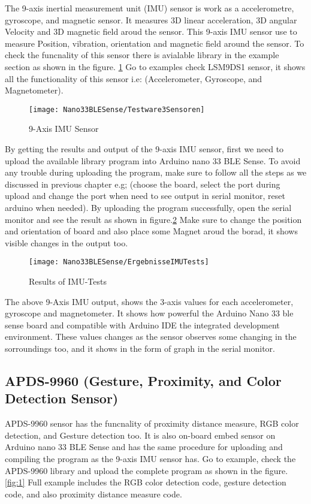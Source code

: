 The 9-axis inertial measurement unit (IMU) sensor is work as a accelerometre, gyroscope, and magnetic sensor. It measures 3D linear acceleration, 3D angular Velocity and 3D magnetic field aroud the sensor. This 9-axis IMU sensor use to measure Position, vibration, orientation and magnetic field around the sensor. To check the funcnality of this sensor there is avialable library in the example section as shown in the figure. \ref{fig:Testware} Go to examples check LSM9DS1 sensor, it shows all the functionality of this sensor i.e: (Accelerometer, Gyroscope, and Magnetometer).


\begin{figure}[htbp]
	\centering
	\texttt{[image: Nano33BLESense/Testware3Sensoren]}
	\caption{9-Axis IMU Sensor}
	\label{fig:Testware}
\end{figure}

By getting the results and output of the 9-axis IMU sensor, first we need to upload the available library program into Arduino nano 33 BLE Sense. To avoid any trouble during uploading the program, make sure to follow all the steps as we discussed in previous chapter e.g; (choose the board, select the port during upload and change the port when need to see output in serial monitor, reset arduino when needed). By uploading the program successfully, open the serial monitor and see the result as shown in figure.\ref{fig:IMU-Test} Make sure to change the position and orientation of board and also place some Magnet aroud the borad, it shows visible changes in the output too.

\begin{figure}[htbp]
	\centering
	\texttt{[image: Nano33BLESense/ErgebnisseIMUTests]}
	\caption{Results of IMU-Tests}
	\label{fig:IMU-Test}
\end{figure}

The above 9-Axis IMU output, shows the 3-axis values for each accelerometer, gyroscope and magnetometer. It shows how powerful the Arduino Nano 33 ble sense board and compatible with Arduino IDE the integrated development environment. These values changes as the sensor observes some changing in the sorroundings too, and it shows in the form of graph in the serial monitor. 


\subsection{APDS-9960 (Gesture, Proximity, and Color Detection Sensor)}
APDS-9960 sensor has the funcnality of proximity distance measure, RGB color detection, and Gesture detection too. It is also on-board embed sensor on Arduino nano 33 BLE Sense and has the same procedure for uploading and compiling the program as the 9-axis IMU sensor has. Go to example, check the APDS-9960 library and upload the complete program as shown in the figure. \ref{fig:1} Full example includes the RGB color detection code, gesture detection code, and also proximity distance measure code.

